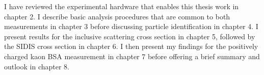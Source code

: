 I have reviewed the experimental hardware that enables this thesis work in chapter 2.  I describe basic analysis procedures that are common to both measurements in chapter 3 before discussing particle identification in chapter 4.  I present results for the inclusive scattering cross section in chapter 5, followed by the SIDIS cross section in chapter 6.  I then present my findings for the positively charged kaon BSA measurement in chapter 7 before offering a brief summary and outlook in chapter 8. 

